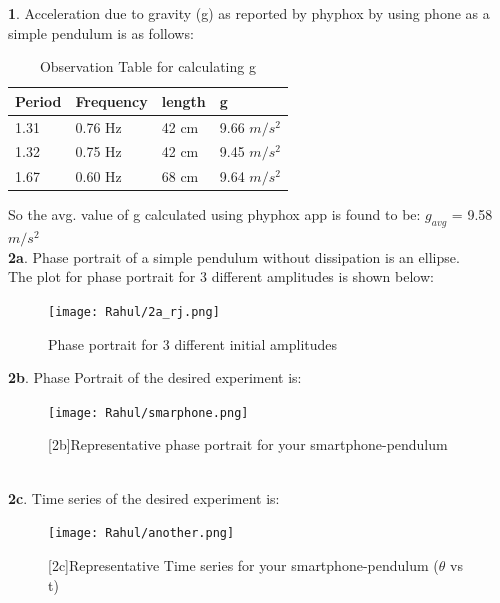 \documentclass[11pt]{scrartcl} %
\begin{document}
\textbf{1}.
Acceleration due to gravity (g) as reported by phyphox by using phone as a simple pendulum is as follows:\\

\begin{table}[h] %
	\centering %
	\begin{tabular}{l l l l}
		\toprule
		\textbf{Period} & \textbf{Frequency} & \textbf{length} & \textbf{g} \\
		\midrule
		1.31 & 0.76 Hz & 42 cm & 9.66 $m/s^2$\\
        1.32 & 0.75 Hz & 42 cm & 9.45 $m/s^2$\\
        1.67 & 0.60 Hz & 68 cm & 9.64 $m/s^2$\\
		\bottomrule
	\end{tabular}
	\caption{Observation Table for calculating g}
\end{table}

So the avg. value of g calculated using phyphox app is found to be: $g_{avg}$ = 9.58 $m/s^2$ \\


\textbf{2a}.
Phase portrait of a simple pendulum without dissipation is an ellipse.\\
The plot for phase portrait for 3 different amplitudes is shown below:

\begin{figure}[h] %
	\centering
	\texttt{[image: Rahul/2a\_rj.png]} %
	\caption{Phase portrait for 3 different initial amplitudes}
\end{figure}

\newpage
\textbf{2b}.
Phase Portrait of the desired experiment is:
\begin{figure}[h] %
	\centering
	\texttt{[image: Rahul/smarphone.png]} %
	\caption {[2b]Representative phase portrait for your smartphone-pendulum}
\end{figure}

\\
\textbf{2c}.
Time series of the desired experiment is:
\begin{figure}[h] %
	\centering
	\texttt{[image: Rahul/another.png]} %
	\caption {[2c]Representative Time series for your smartphone-pendulum ($\theta$ vs t)}
\end{figure}
\end{document}
